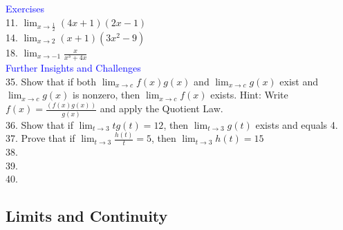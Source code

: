 \documentclass{article}
\begin{document}
\textcolor{blue}{Exercises}\\
11. $\lim_{x \to \frac{1}{2}}(4x + 1)(2x - 1)$\\
14. $\lim_{x \to 2}(x + 1)(3x^2 - 9)$\\
18. $\lim_{x \to -1}\frac{x}{x^3 + 4x}$\\

\textcolor{blue}{Further Insights and Challenges}\\
35. Show that if both $\lim_{x \to c}f(x)g(x)$ and $\lim_{x \to c}g(x)$ exist and $\lim_{x \to c}g(x)$ is nonzero, then $\lim_{x \to c}f(x)$ exists. Hint: Write $f(x) = \frac{(f(x)g(x))}{g(x)}$ and apply the Quotient Law.\\
36. Show that if $\lim_{t \to 3}tg(t) = 12$, then $\lim_{t \to 3}g(t)$ exists and equals 4.\\
37. Prove that if $\lim_{t \to 3}\frac{h(t)}{t} = 5$, then $\lim_{t \to 3}h(t) = 15$\\
38.\\
39.\\
40.\\

\subsection*{Limits and Continuity}
\end{document}
